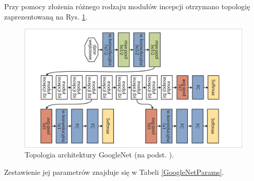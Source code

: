 Przy pomocy złożenia różnego rodzaju modułów incepcji otrzymano topologię zaprezentowaną na Rys. \ref{GoogleNetTopo}.
\begin{figure}[h!]
	\centering
	\includegraphics[width=1\textwidth]{figures/GoogleNet.jpg}
	\caption{Topologia architektury GoogleNet (na podst. \cite{GoogleNet}).}
	\label{GoogleNetTopo}
\end{figure}
Zestawienie jej parametrów znajduje się w Tabeli \ref{GoogleNetParams}.
\renewcommand{\arraystretch}{1.2}
